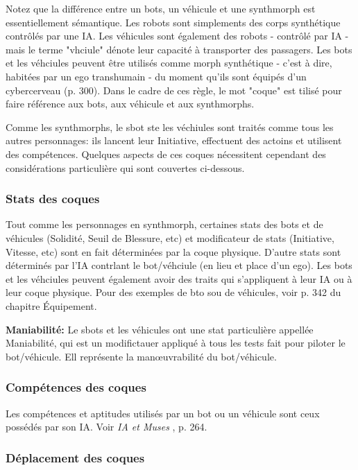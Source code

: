 Notez que la différence entre un bots, un véhicule et une synthmorph est essentiellement sémantique. Les robots sont simplements des corps synthétique contrôlés par une IA. Les véhicules sont également des robots - contrôlé par IA - mais le terme "vhciule" dénote leur capacité à transporter des passagers. Les bots et les véhciules peuvent être utilisés comme morph synthétique - c'est à dire, habitées par un ego transhumain - du moment qu'ils sont équipés d'un cybercerveau (p. 300). Dans le cadre de ces règle, le mot "coque" est tilisé pour faire référence aux bots, aux véhicule et aux synthmorphs. 

Comme les synthmorphs, le sbot ste les véchiules sont traités comme tous les autres personnages: ils lancent leur Initiative, effectuent des actoins et utilisent des compétences. Quelques aspects de ces coques nécessitent cependant des considérations particulière qui sont couvertes ci-dessous. 

\subsubsection{Stats des coques} 

Tout comme les personnages en synthmorph, certaines stats des bots et de véhicules (Solidité, Seuil de Blessure, etc) et modificateur de stats (Initiative, Vitesse, etc) sont en fait déterminées par la coque physique. D'autre stats sont déterminés par l'IA contrlant le bot/véhciule (en lieu et place d'un ego). Les bots et les véhciules peuvent également avoir des traits qui s'appliquent à leur IA ou à leur coque physique. Pour des exemples de bto sou de véhicules, voir p. 342 du chapitre Équipement. 

\textbf{Maniabilité:} Le sbots et les véhicules ont une stat particulière appellée Maniabilité, qui est un modifictauer appliqué à tous les tests fait pour piloter le bot/véhicule. Ell représente la manœuvrabilité du bot/véhicule. 

\subsubsection{Compétences des coques} 

Les compétences et aptitudes utilisés par un bot ou un véhicule sont ceux possédés par son IA. Voir \emph{IA et Muses }, p. 264. 

\subsubsection{Déplacement des coques} 

